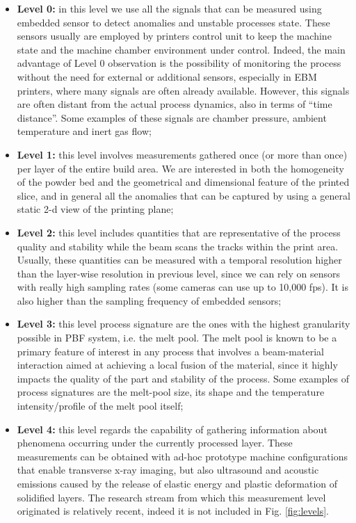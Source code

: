 \begin{itemize}
    \item \textbf{Level 0:} in this level we use all the signals that can be measured using embedded sensor to detect anomalies and unstable processes state. These sensors usually are employed by printers control unit to keep the machine state and the machine chamber environment under control. Indeed, the main advantage of Level 0 observation is the possibility of monitoring the process without the need for external or additional sensors, especially in EBM printers, where many signals are often already available. However, this signals are often distant from the actual process dynamics, also in terms of “time distance”. Some examples of these signals are chamber pressure, ambient temperature and inert gas flow;
    \item \textbf{Level 1:} this level involves measurements gathered once (or more than once) per layer of the entire build area. We are interested in both the homogeneity of the powder bed and the geometrical and dimensional feature of the printed slice, and in general all the anomalies that can be captured by using a general static 2-d view of the printing plane;
    \item \textbf{Level 2:} this level includes quantities that are representative of the process quality and stability while the beam scans the tracks within the print area. Usually, these quantities can be measured with a temporal resolution higher than the layer-wise resolution in previous level, since we can rely on sensors with really high sampling rates (some cameras can use up to 10,000 fps). It is also higher than the sampling frequency of embedded sensors;
    \item \textbf{Level 3:} this level process signature are the ones with the highest granularity possible in PBF system, i.e. the melt pool. The melt pool is known to be a primary feature of interest in any process that involves a beam-material interaction aimed at achieving a local fusion of the material, since it highly impacts the quality of the part and stability of the process. Some examples of process signatures are the melt-pool size, its shape and the temperature intensity/profile of the melt pool itself;
    \item \textbf{Level 4:} this level regards the capability of gathering information about phenomena occurring under the currently processed layer. These measurements can be obtained with ad-hoc prototype machine configurations that enable transverse x-ray imaging, but also ultrasound and acoustic emissions caused by the release of elastic energy and plastic deformation of solidified layers. The research stream from which this measurement level originated is relatively recent, indeed it is not included in Fig. \ref{fig:levels}.
\end{itemize}

